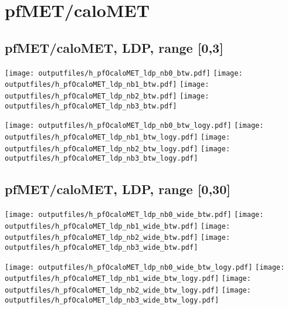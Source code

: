 \documentclass[11pt]{article}
\begin{document}
   \section{ pfMET/caloMET}

    \subsection{ pfMET/caloMET, LDP, range [0,3]}

    \noindent
     \texttt{[image: outputfiles/h\_pfOcaloMET\_ldp\_nb0\_btw.pdf]}
     \texttt{[image: outputfiles/h\_pfOcaloMET\_ldp\_nb1\_btw.pdf]}
     \texttt{[image: outputfiles/h\_pfOcaloMET\_ldp\_nb2\_btw.pdf]}
     \texttt{[image: outputfiles/h\_pfOcaloMET\_ldp\_nb3\_btw.pdf]}

    \noindent
     \texttt{[image: outputfiles/h\_pfOcaloMET\_ldp\_nb0\_btw\_logy.pdf]}
     \texttt{[image: outputfiles/h\_pfOcaloMET\_ldp\_nb1\_btw\_logy.pdf]}
     \texttt{[image: outputfiles/h\_pfOcaloMET\_ldp\_nb2\_btw\_logy.pdf]}
     \texttt{[image: outputfiles/h\_pfOcaloMET\_ldp\_nb3\_btw\_logy.pdf]}

    \clearpage



    \subsection{ pfMET/caloMET, LDP, range [0,30]}

    \noindent
     \texttt{[image: outputfiles/h\_pfOcaloMET\_ldp\_nb0\_wide\_btw.pdf]}
     \texttt{[image: outputfiles/h\_pfOcaloMET\_ldp\_nb1\_wide\_btw.pdf]}
     \texttt{[image: outputfiles/h\_pfOcaloMET\_ldp\_nb2\_wide\_btw.pdf]}
     \texttt{[image: outputfiles/h\_pfOcaloMET\_ldp\_nb3\_wide\_btw.pdf]}

    \noindent
     \texttt{[image: outputfiles/h\_pfOcaloMET\_ldp\_nb0\_wide\_btw\_logy.pdf]}
     \texttt{[image: outputfiles/h\_pfOcaloMET\_ldp\_nb1\_wide\_btw\_logy.pdf]}
     \texttt{[image: outputfiles/h\_pfOcaloMET\_ldp\_nb2\_wide\_btw\_logy.pdf]}
     \texttt{[image: outputfiles/h\_pfOcaloMET\_ldp\_nb3\_wide\_btw\_logy.pdf]}
\end{document}
